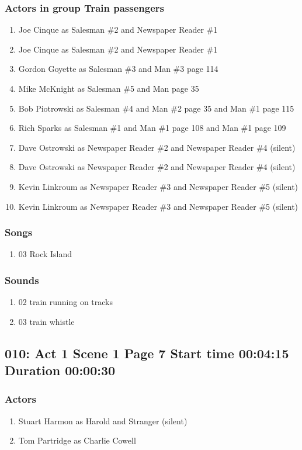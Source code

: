 \subsubsection{Actors in group Train passengers}
\begin{enumerate}
\item Joe Cinque as Salesman \#2 and Newspaper Reader \#1
\item Joe Cinque as Salesman \#2 and Newspaper Reader \#1
\item Gordon Goyette as Salesman \#3 and Man \#3 page 114
\item Mike McKnight as Salesman \#5 and Man page 35
\item Bob Piotrowski as Salesman \#4 and Man \#2 page 35 and Man \#1 page 115
\item Rich Sparks as Salesman \#1 and Man \#1 page 108 and Man \#1 page 109
\item Dave Ostrowski as Newspaper Reader \#2 and Newspaper Reader \#4 (silent)
\item Dave Ostrowski as Newspaper Reader \#2 and Newspaper Reader \#4 (silent)
\item Kevin Linkroum as Newspaper Reader \#3 and Newspaper Reader \#5 (silent)
\item Kevin Linkroum as Newspaper Reader \#3 and Newspaper Reader \#5 (silent)
\end{enumerate}

\subsubsection{Songs}
\begin{enumerate}
\item 03 Rock Island
\end{enumerate}\subsubsection{Sounds}
\begin{enumerate}
\item 02 train running on tracks
\item 03 train whistle
\end{enumerate}
\subsection{010: Act 1 Scene 1 Page 7 Start time 00:04:15 Duration 00:00:30}

\subsubsection{Actors}
\begin{enumerate}
\item Stuart Harmon as Harold and Stranger (silent)
\item Tom Partridge as Charlie Cowell
\end{enumerate}
